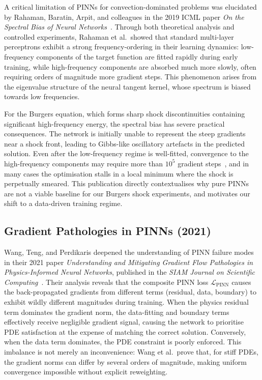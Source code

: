 A critical limitation of PINNs for convection-dominated problems was elucidated by Rahaman, Baratin, Arpit, and colleagues in the 2019 ICML paper \emph{On the Spectral Bias of Neural Networks}~\cite{rahaman2019spectral}. Through both theoretical analysis and controlled experiments, Rahaman et al.\ showed that standard multi-layer perceptrons exhibit a strong frequency-ordering in their learning dynamics: low-frequency components of the target function are fitted rapidly during early training, while high-frequency components are absorbed much more slowly, often requiring orders of magnitude more gradient steps. This phenomenon arises from the eigenvalue structure of the neural tangent kernel, whose spectrum is biased towards low frequencies.

For the Burgers equation, which forms sharp shock discontinuities containing significant high-frequency energy, the spectral bias has severe practical consequences. The network is initially unable to represent the steep gradients near a shock front, leading to Gibbs-like oscillatory artefacts in the predicted solution. Even after the low-frequency regime is well-fitted, convergence to the high-frequency components may require more than $10^5$ gradient steps~\cite{rahaman2019spectral}, and in many cases the optimisation stalls in a local minimum where the shock is perpetually smeared. This publication directly contextualises why pure PINNs are not a viable baseline for our Burgers shock experiments, and motivates our shift to a data-driven training regime.

\subsection{Gradient Pathologies in PINNs (2021)}
\label{sec:bg:gradient-pathologies}

Wang, Teng, and Perdikaris deepened the understanding of PINN failure modes in their 2021 paper \emph{Understanding and Mitigating Gradient Flow Pathologies in Physics-Informed Neural Networks}, published in the \emph{SIAM Journal on Scientific Computing}~\cite{wang2021understanding}. Their analysis reveals that the composite PINN loss $\mathcal{L}_{\mathrm{PINN}}$ causes the back-propagated gradients from different terms (residual, data, boundary) to exhibit wildly different magnitudes during training. When the physics residual term dominates the gradient norm, the data-fitting and boundary terms effectively receive negligible gradient signal, causing the network to prioritise PDE satisfaction at the expense of matching the correct solution. Conversely, when the data term dominates, the PDE constraint is poorly enforced. This imbalance is not merely an inconvenience: Wang et al.\ prove that, for stiff PDEs, the gradient norms can differ by several orders of magnitude, making uniform convergence impossible without explicit reweighting.

